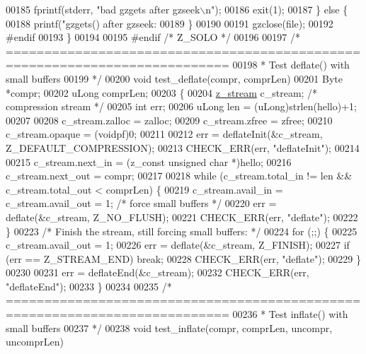\begin{DoxyCode}
{{{{{{{{{{00185         fprintf(stderr, \textcolor{stringliteral}{"bad gzgets after gzseek\(\backslash\)n"});
00186         exit(1);
00187     \} \textcolor{keywordflow}{else} \{
00188         printf(\textcolor{stringliteral}{"gzgets() after gzseek: %
00189     \}
00190 
00191     gzclose(file);
00192 \textcolor{preprocessor}{#endif}
00193 \}
00194 
00195 \textcolor{preprocessor}{#endif }\textcolor{comment}{/* Z\_SOLO */}\textcolor{preprocessor}{}
00196 
00197 \textcolor{comment}{/* ===========================================================================}
00198 \textcolor{comment}{ * Test deflate() with small buffers}
00199 \textcolor{comment}{ */}
00200 \textcolor{keywordtype}{void} test\_deflate(compr, comprLen)
00201     Byte *compr;
00202     uLong comprLen;
00203 \{
00204     \hyperlink{structz__stream__s}{z\_stream} c\_stream; \textcolor{comment}{/* compression stream */}
00205     \textcolor{keywordtype}{int} err;
00206     uLong len = (uLong)strlen(hello)+1;
00207 
00208     c\_stream.zalloc = zalloc;
00209     c\_stream.zfree = zfree;
00210     c\_stream.opaque = (voidpf)0;
00211 
00212     err = deflateInit(&c\_stream, Z\_DEFAULT\_COMPRESSION);
00213     CHECK\_ERR(err, \textcolor{stringliteral}{"deflateInit"});
00214 
00215     c\_stream.next\_in  = (z\_const \textcolor{keywordtype}{unsigned} \textcolor{keywordtype}{char} *)hello;
00216     c\_stream.next\_out = compr;
00217 
00218     \textcolor{keywordflow}{while} (c\_stream.total\_in != len && c\_stream.total\_out < comprLen) \{
00219         c\_stream.avail\_in = c\_stream.avail\_out = 1; \textcolor{comment}{/* force small buffers */}
00220         err = deflate(&c\_stream, Z\_NO\_FLUSH);
00221         CHECK\_ERR(err, \textcolor{stringliteral}{"deflate"});
00222     \}
00223     \textcolor{comment}{/* Finish the stream, still forcing small buffers: */}
00224     \textcolor{keywordflow}{for} (;;) \{
00225         c\_stream.avail\_out = 1;
00226         err = deflate(&c\_stream, Z\_FINISH);
00227         \textcolor{keywordflow}{if} (err == Z\_STREAM\_END) \textcolor{keywordflow}{break};
00228         CHECK\_ERR(err, \textcolor{stringliteral}{"deflate"});
00229     \}
00230 
00231     err = deflateEnd(&c\_stream);
00232     CHECK\_ERR(err, \textcolor{stringliteral}{"deflateEnd"});
00233 \}
00234 
00235 \textcolor{comment}{/* ===========================================================================}
00236 \textcolor{comment}{ * Test inflate() with small buffers}
00237 \textcolor{comment}{ */}
00238 \textcolor{keywordtype}{void} test\_inflate(compr, comprLen, uncompr, uncomprLen)
}}}}}}}}}}}
\end{DoxyCode}
